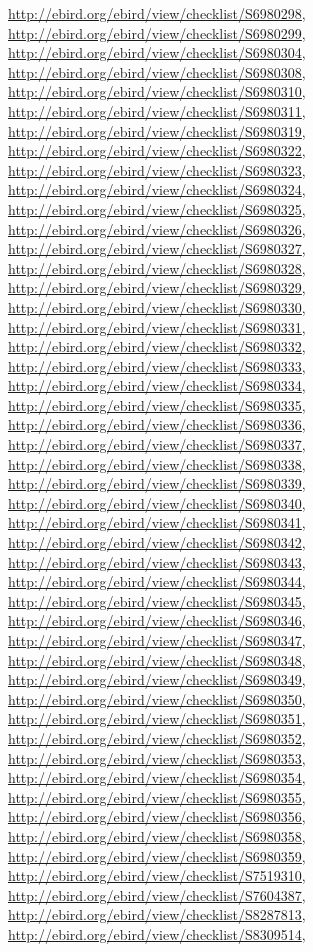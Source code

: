 \documentclass[9pt, article]{memoir}
\begin{document}
\begin{multicols}{2}
\url{http://ebird.org/ebird/view/checklist/S6980298}, 
\url{http://ebird.org/ebird/view/checklist/S6980299}, 
\url{http://ebird.org/ebird/view/checklist/S6980304}, 
\url{http://ebird.org/ebird/view/checklist/S6980308}, 
\url{http://ebird.org/ebird/view/checklist/S6980310}, 
\url{http://ebird.org/ebird/view/checklist/S6980311}, 
\url{http://ebird.org/ebird/view/checklist/S6980319}, 
\url{http://ebird.org/ebird/view/checklist/S6980322}, 
\url{http://ebird.org/ebird/view/checklist/S6980323}, 
\url{http://ebird.org/ebird/view/checklist/S6980324}, 
\url{http://ebird.org/ebird/view/checklist/S6980325}, 
\url{http://ebird.org/ebird/view/checklist/S6980326}, 
\url{http://ebird.org/ebird/view/checklist/S6980327}, 
\url{http://ebird.org/ebird/view/checklist/S6980328}, 
\url{http://ebird.org/ebird/view/checklist/S6980329}, 
\url{http://ebird.org/ebird/view/checklist/S6980330}, 
\url{http://ebird.org/ebird/view/checklist/S6980331}, 
\url{http://ebird.org/ebird/view/checklist/S6980332}, 
\url{http://ebird.org/ebird/view/checklist/S6980333}, 
\url{http://ebird.org/ebird/view/checklist/S6980334}, 
\url{http://ebird.org/ebird/view/checklist/S6980335}, 
\url{http://ebird.org/ebird/view/checklist/S6980336}, 
\url{http://ebird.org/ebird/view/checklist/S6980337}, 
\url{http://ebird.org/ebird/view/checklist/S6980338}, 
\url{http://ebird.org/ebird/view/checklist/S6980339}, 
\url{http://ebird.org/ebird/view/checklist/S6980340}, 
\url{http://ebird.org/ebird/view/checklist/S6980341}, 
\url{http://ebird.org/ebird/view/checklist/S6980342}, 
\url{http://ebird.org/ebird/view/checklist/S6980343}, 
\url{http://ebird.org/ebird/view/checklist/S6980344}, 
\url{http://ebird.org/ebird/view/checklist/S6980345}, 
\url{http://ebird.org/ebird/view/checklist/S6980346}, 
\url{http://ebird.org/ebird/view/checklist/S6980347}, 
\url{http://ebird.org/ebird/view/checklist/S6980348}, 
\url{http://ebird.org/ebird/view/checklist/S6980349}, 
\url{http://ebird.org/ebird/view/checklist/S6980350}, 
\url{http://ebird.org/ebird/view/checklist/S6980351}, 
\url{http://ebird.org/ebird/view/checklist/S6980352}, 
\url{http://ebird.org/ebird/view/checklist/S6980353}, 
\url{http://ebird.org/ebird/view/checklist/S6980354}, 
\url{http://ebird.org/ebird/view/checklist/S6980355}, 
\url{http://ebird.org/ebird/view/checklist/S6980356}, 
\url{http://ebird.org/ebird/view/checklist/S6980358}, 
\url{http://ebird.org/ebird/view/checklist/S6980359}, 
\url{http://ebird.org/ebird/view/checklist/S7519310}, 
\url{http://ebird.org/ebird/view/checklist/S7604387}, 
\url{http://ebird.org/ebird/view/checklist/S8287813}, 
\url{http://ebird.org/ebird/view/checklist/S8309514}, 

\end{multicols}
\end{document}
